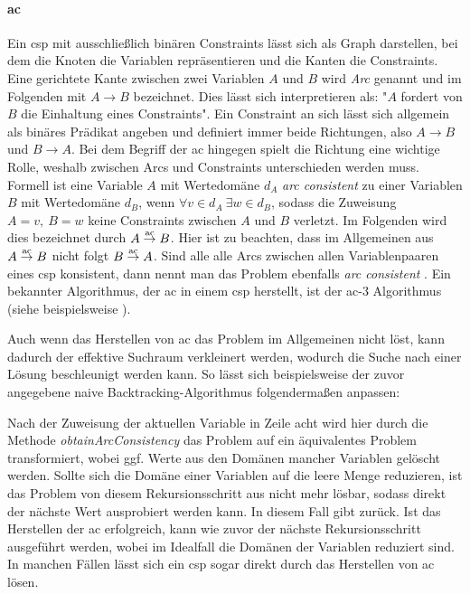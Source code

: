 \paragraph{\acl*{ac}} Ein \ac*{csp} mit ausschließlich binären Constraints lässt 
sich als Graph darstellen, bei dem die Knoten die Variablen repräsentieren und die Kanten die Constraints. Eine gerichtete Kante zwischen zwei Variablen $A$ und $B$ wird \textit{Arc}
genannt und im Folgenden mit $A \rightarrow B$ bezeichnet. Dies lässt sich interpretieren als: "$A$ fordert von $B$ die Einhaltung eines Constraints". Ein Constraint an sich lässt
sich allgemein als binäres Prädikat angeben und definiert immer beide Richtungen, also $A \rightarrow B$ und $B \rightarrow A$. Bei dem Begriff der \acl*{ac} hingegen spielt die
Richtung eine wichtige Rolle, weshalb zwischen Arcs und Constraints unterschieden werden muss. Formell ist eine Variable $A$ mit Wertedomäne $d_A$ \textit{arc consistent} zu einer
Variablen $B$ mit Wertedomäne $d_B$, wenn $\forall v \in d_A \ \exists w \in d_B$, sodass die Zuweisung $A = v, \ B = w$ keine Constraints zwischen $A$ und $B$ verletzt. Im Folgenden
wird dies bezeichnet durch $A \stackrel{\text{ac}}{\rightarrow} B$. Hier ist zu beachten, dass im Allgemeinen aus $A \stackrel{\text{ac}}{\rightarrow} B$ nicht folgt $B \stackrel{\text{ac}}{\rightarrow} A$. Sind alle alle Arcs zwischen allen Variablenpaaren
eines \ac*{csp} konsistent, dann nennt man das Problem ebenfalls \textit{arc consistent} \cite{ACOverview}. Ein bekannter Algorithmus, der \ac*{ac} in einem \ac*{csp} herstellt,
ist der \ac*{ac}-3 Algorithmus (siehe beispielsweise \cite{ac3}). 

Auch wenn das Herstellen von \ac*{ac} das Problem im Allgemeinen nicht löst, kann dadurch der effektive Suchraum verkleinert werden, wodurch die Suche nach einer Lösung beschleunigt
werden kann. So lässt sich beispielsweise der zuvor angegebene naive Backtracking-Algorithmus folgendermaßen anpassen:

Nach der Zuweisung der aktuellen Variable in Zeile acht wird hier durch die Methode \textit{obtainArcConsistency} das Problem auf ein äquivalentes Problem transformiert, wobei
ggf. Werte aus den Domänen mancher Variablen gelöscht werden. Sollte sich die Domäne einer Variablen auf die leere Menge reduzieren, ist das Problem von diesem Rekursionsschritt
aus nicht mehr lösbar, sodass direkt der nächste Wert ausprobiert werden kann. In diesem Fall gibt   zurück. Ist das Herstellen der
\ac*{ac} erfolgreich, kann wie zuvor der nächste Rekursionsschritt ausgeführt werden, wobei im Idealfall die Domänen der Variablen reduziert sind. In manchen Fällen lässt sich ein
\ac*{csp} sogar direkt durch das Herstellen von \ac*{ac} lösen.